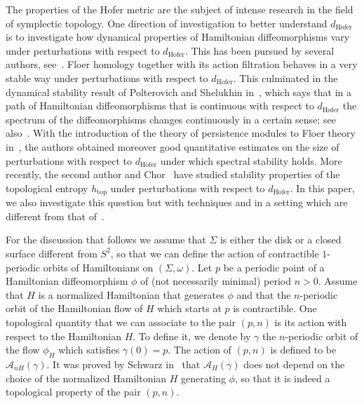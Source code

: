 \documentclass[AHL,Unicode,longabstracts,published]{cedram}
\newcommand{\topo}{\mathrm{top}}
\newcommand{\hofer}{\mathrm{Hofer}}
\newcommand{\clA}{\mathcal{A}}
\newcommand{\topo}{\mathrm{top}}
\newcommand{\hofer}{\mathrm{Hofer}}
\begin{document}
The properties of the Hofer metric are the subject of intense research in the field of symplectic topology. One direction of investigation to better understand $d_{\hofer}$ is to investigate how dynamical properties of Hamiltonian diffeomorphisms vary under perturbations with respect to $d_{\hofer}$. This has been pursued by several authors, see~\cite{chor2020,kislev2018bounds,leonidpersistence,PolterovichShelukhin2016,Usher}. Floer homology together with its action filtration behaves in a very stable way under perturbations with respect to $d_{\hofer}$. This culminated in the dynamical stability result of Polterovich and Shelukhin in~\cite{PolterovichShelukhin2016}, which says that in a path of Hamiltonian diffeomorphisms that is continuous with respect to $d_{\hofer}$ the spectrum of the diffeomorphisms changes continuously in a certain sense; see also~\cite{leonidpersistence,Usher}. With the introduction of the theory of persistence modules to Floer theory in~\cite{PolterovichShelukhin2016}, the authors obtained moreover good quantitative estimates on the size of perturbations with respect to $d_{\hofer}$ under which spectral stability holds. More recently, the second author and Chor~\cite{chor-meiwes} have studied stability properties of the topological entropy $h_{\topo}$ under perturbations with respect to $d_{\hofer}$. In this paper, we also investigate this question but with techniques and in a setting which are different from that of~\cite{chor-meiwes}.

For the discussion that follows we assume that $\Sigma$ is either the disk or a closed surface different from $S^2$, so that we can define the action of contractible $1$-periodic orbits of Hamiltonians on $(\Sigma,\omega)$. Let $p$ be a periodic point of a Hamiltonian diffeomorphism $\phi$ of (not necessarily minimal) period $n>0$. Assume that $H$ is a normalized Hamiltonian that generates $\phi$ and that the $n$-periodic orbit of the Hamiltonian flow of $H$ which starts at $p$ is contractible. One topological quantity that we can associate to the pair $(p,n)$ is its action with respect to the Hamiltonian $H$. To define it, we denote by $\gamma$ the $n$-periodic orbit of the flow $\phi_H$ which satisfies $\gamma(0)=p$. The action of $(p,n)$ is defined to be $\clA_{nH}(\gamma)$. It was proved by Schwarz in~\cite{schwarz-action} that $\clA_H(\gamma)$ does not depend on the choice of the normalized Hamiltonian $H$ generating $\phi$, so that it is indeed a topological property of the pair $(p,n)$.
\end{document}
